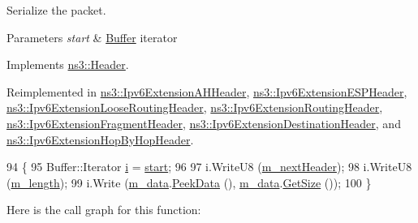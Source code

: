 Serialize the packet. 


\begin{DoxyParams}{Parameters}
{\em start} & \hyperlink{classns3_1_1Buffer}{Buffer} iterator \\
\hline
\end{DoxyParams}


Implements \hyperlink{classns3_1_1Header_afb61f1aac69ff8349a6bfe521fab5404}{ns3\+::\+Header}.



Reimplemented in \hyperlink{classns3_1_1Ipv6ExtensionAHHeader_a903f2117b1810f9fdd66558517c0cf5c}{ns3\+::\+Ipv6\+Extension\+A\+H\+Header}, \hyperlink{classns3_1_1Ipv6ExtensionESPHeader_a750e9ec634479cf7cc46d3dbe3870f84}{ns3\+::\+Ipv6\+Extension\+E\+S\+P\+Header}, \hyperlink{classns3_1_1Ipv6ExtensionLooseRoutingHeader_a1061efc35027a488100b5af25de2012d}{ns3\+::\+Ipv6\+Extension\+Loose\+Routing\+Header}, \hyperlink{classns3_1_1Ipv6ExtensionRoutingHeader_a33d8ab5f11d270295e3f5a9b4581bd56}{ns3\+::\+Ipv6\+Extension\+Routing\+Header}, \hyperlink{classns3_1_1Ipv6ExtensionFragmentHeader_ac63d2e1a8fe9f7cdb3589c2677f5f9f6}{ns3\+::\+Ipv6\+Extension\+Fragment\+Header}, \hyperlink{classns3_1_1Ipv6ExtensionDestinationHeader_a13d3b01676de81cbcdd3fcebaf2fdd6b}{ns3\+::\+Ipv6\+Extension\+Destination\+Header}, and \hyperlink{classns3_1_1Ipv6ExtensionHopByHopHeader_aea3c87fde9d6ba5375838cbe3275361b}{ns3\+::\+Ipv6\+Extension\+Hop\+By\+Hop\+Header}.


\begin{DoxyCode}
94 \{
95   Buffer::Iterator \hyperlink{bernuolliDistribution_8m_a6f6ccfcf58b31cb6412107d9d5281426}{i} = \hyperlink{namespacevisualizer_1_1core_a2a35e5d8a34af358b508dac8635754e0}{start};
96 
97   i.WriteU8 (\hyperlink{classns3_1_1Ipv6ExtensionHeader_a17e21188b4094d59a1b194d20552ef2e}{m\_nextHeader});
98   i.WriteU8 (\hyperlink{classns3_1_1Ipv6ExtensionHeader_aebd490c06dfde17f84b92baa3349afc8}{m\_length});
99   i.Write (\hyperlink{classns3_1_1Ipv6ExtensionHeader_a5d93365540e0de7501c630674b5f5b0b}{m\_data}.\hyperlink{classns3_1_1Buffer_a07800b41f95ec9c5bfdfae624b9351b0}{PeekData} (), \hyperlink{classns3_1_1Ipv6ExtensionHeader_a5d93365540e0de7501c630674b5f5b0b}{m\_data}.\hyperlink{classns3_1_1Buffer_a3047b8f2dad303c6370695122f1884f0}{GetSize} ());
100 \}
\end{DoxyCode}


Here is the call graph for this function\+:


